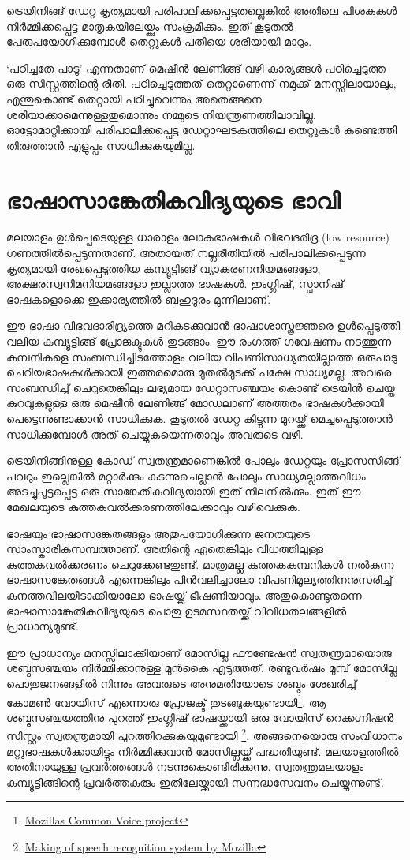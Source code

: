 \documentclass[12pt,twoside,a4paper]{article}
\begin{document}
ട്രെയിനിങ്ങ് ഡേറ്റ കൃത്യമായി പരിപാലിക്കപ്പെട്ടതല്ലെങ്കിൽ അതിലെ പിശകുകൾ നിർമ്മിക്കപ്പെട്ട മാതൃകയിലേയ്ക്കും സംക്രമിക്കും. ഇത് കൂടുതൽ പേരുപയോഗിക്കുമ്പോൾ തെറ്റുകൾ പതിയെ ശരിയായി മാറും.

`പഠിച്ചതേ പാടൂ' എന്നതാണ് മെഷീൻ ലേണിങ്ങ് വഴി കാര്യങ്ങൾ പഠിച്ചെടുത്ത ഒരു സിസ്റ്റത്തിന്റെ രീതി. പഠിച്ചെടുത്തത് തെറ്റാണെന്ന് നമുക്ക് മനസ്സിലായാലും, എന്തുകൊണ്ട് തെറ്റായി പഠിച്ചുവെന്നും അതെങ്ങനെ ശരിയാക്കാമെന്നുള്ളതുമൊന്നും നമ്മുടെ നിയന്ത്രണത്തിലാവില്ല.  ഓട്ടോമാറ്റിക്കായി പരിപാലിക്കപ്പെട്ട ഡേറ്റാഘടകത്തിലെ തെറ്റുകൾ  കണ്ടെത്തി തിരുത്താൻ എളുപ്പം സാധിക്കുകയുമില്ല.

\section{ഭാഷാസാങ്കേതികവിദ്യയുടെ ഭാവി}

മലയാളം ഉൾപ്പെടെയുള്ള ധാരാളം ലോകഭാഷകൾ വിഭവദരിദ്ര (low resource) ഗണത്തിൽപ്പെടുന്നതാണ്. അതായത് നല്ലരീതിയിൽ പരിപാലിക്കപ്പെടുന്ന കൃത്യമായി രേഖപ്പെടുത്തിയ കമ്പ്യൂട്ടിങ്ങ് വ്യാകരണനിയമങ്ങളോ, അക്ഷരസ്വനിമനിയമങ്ങളോ ഇല്ലാത്ത ഭാഷകൾ. ഇംഗ്ലിഷ്, സ്പാനിഷ് ഭാഷകളൊക്കെ ഇക്കാര്യത്തിൽ ബഹുദൂരം മുന്നിലാണ്.

ഈ ഭാഷാ വിഭവദാരിദ്ര്യത്തെ മറികടക്കുവാൻ ഭാഷാശാസ്ത്രജ്ഞരെ ഉൾപ്പെടുത്തി വലിയ കമ്പ്യൂട്ടിങ്ങ് പ്രോജക്ടുകൾ തുടങ്ങാം. ഈ രംഗത്ത് ഗവേഷണം നടത്തുന്ന കമ്പനികളെ സംബന്ധിച്ചിടത്തോളം വലിയ വിപണിസാധ്യതയില്ലാത്ത ഒരുപാടു ചെറിയഭാഷകൾക്കായി ഇത്തരമൊരു മുതൽമുടക്ക്  പക്ഷേ സാധ്യമല്ല. അവരെ സംബന്ധിച്ച് ചെറുതെങ്കിലും ലഭ്യമായ ഡേറ്റാസഞ്ചയം കൊണ്ട് ട്രെയിൻ ചെയ്ത കുറവുകളുള്ള ഒരു മെഷീൻ ലേണിങ്ങ്  മോഡലാണ് അത്തരം ഭാഷകൾക്കായി പെട്ടെന്നുണ്ടാക്കാൻ സാധിക്കുക. കൂടുതൽ ഡേറ്റ കിട്ടുന്ന മുറയ്ക്ക് മെച്ചപ്പെടുത്താൻ സാധിക്കുമ്പോൾ അത് ചെയ്യുകയെന്നതാവും അവരുടെ വഴി.

ട്രെയിനിങ്ങിനുള്ള കോഡ് സ്വതന്ത്രമാണെങ്കിൽ പോലും ഡേറ്റയും പ്രോസസിങ്ങ് പവറും ഇല്ലെങ്കിൽ മറ്റാർക്കും കടന്നുചെല്ലാൻ പോലും  സാധ്യമല്ലാത്തവിധം അടച്ചുപൂട്ടപ്പെട്ട ഒരു സാങ്കേതികവിദ്യയായി ഇത് നിലനിൽക്കും. ഇത് ഈ മേഖലയുടെ കുത്തകവൽക്കരണത്തിലേക്കാവും വഴിവെക്കുക.

ഭാഷയും ഭാഷാസങ്കേതങ്ങളും അതുപയോഗിക്കുന്ന ജനതയുടെ സാംസ്കാരികസമ്പത്താണ്. അതിന്റെ ഏതെങ്കിലും വിധത്തിലുള്ള കുത്തകവൽക്കരണം ചെറുക്കേണ്ടതുണ്ട്. മാത്രമല്ല കുത്തകകമ്പനികൾ നൽകുന്ന ഭാഷാസങ്കേതങ്ങൾ എന്നെങ്കിലും പിൻവലിച്ചാലോ വിപണിമൂല്യത്തിനനുസരിച്ച്  കനത്തവിലയീടാക്കിയാലോ ഭാഷയ്ക്ക് ഭീഷണിയാവും. അതുകൊണ്ടുതന്നെ ഭാഷാസാങ്കേതികവിദ്യയുടെ പൊതു ഉടമസ്ഥതയ്ക്ക് വിവിധതലങ്ങളിൽ പ്രാധാന്യമുണ്ട്.

ഈ പ്രാധാന്യം മനസ്സിലാക്കിയാണ് മോസില്ല ഫൗണ്ടേഷൻ സ്വതന്ത്രമായൊരു ശബ്ദസഞ്ചയം നിർമ്മിക്കാനുള്ള മുൻകൈ എടുത്തത്. രണ്ടുവർഷം മുമ്പ് മോസില്ല പൊതുജനങ്ങളിൽ നിന്നും അവരുടെ അനുമതിയോടെ ശബ്ദം ശേഖരിച്ച് കോമൺ വോയിസ് എന്നൊരു പ്രോജക്ട് തുടങ്ങുകയുണ്ടായി\footnote{\href{https://blog.mozilla.org/blog/2017/11/29/announcing-the-initial-release-of-mozillas-open-source-speech-recognition-model-and-voice-dataset/}{Mozillas Common Voice project}}. ആ ശബ്ദസഞ്ചയത്തിനു പുറത്ത് ഇംഗ്ലിഷ് ഭാഷയ്ക്കായി ഒരു വോയിസ് റെക്കഗ്നിഷൻ സിസ്റ്റം സ്വതന്ത്രമായി പുറത്തിറക്കുകയുമുണ്ടായി \footnote{\href{https://hacks.mozilla.org/2017/11/a-journey-to-10-word-error-rate/}{Making of speech recognition system by Mozilla}}. അങ്ങനെയൊരു സംവിധാനം മറ്റുഭാഷകൾക്കായിട്ടും നിർമ്മിക്കുവാൻ മോസില്ലയ്ക്ക് പദ്ധതിയുണ്ട്. മലയാളത്തിൽ അതിനായുള്ള പ്രവർത്തങ്ങൾ നടന്നുകൊണ്ടിരിക്കുന്നു. സ്വതന്ത്രമലയാളം കമ്പ്യൂട്ടിങ്ങിന്റെ പ്രവർത്തകരും ഇതിലേയ്ക്കായി സന്നദ്ധസേവനം ചെയ്യുന്നുണ്ട്.
\end{document}
